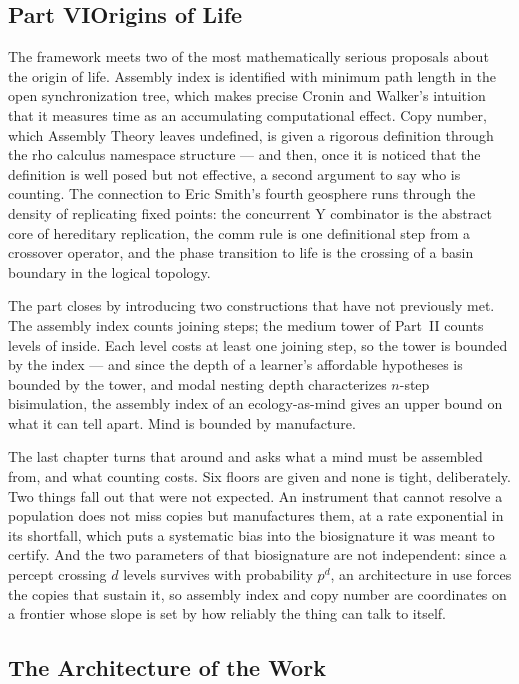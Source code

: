 \documentclass[12pt,openright,twoside]{book}
\theoremstyle{remark}
\theoremstyle{plain}
\theoremstyle{remark}
\theoremstyle{plain}
\theoremstyle{plain}
\begin{document}
\subsection*{Part VI\quad Origins of Life}

The framework meets two of the most mathematically serious proposals
about the origin of life.
Assembly index is identified with minimum path length in the open
synchronization tree, which makes precise Cronin and Walker's intuition
that it measures time as an accumulating computational effect.
Copy number, which Assembly Theory leaves undefined, is given a rigorous
definition through the rho calculus namespace structure --- and then, once
it is noticed that the definition is well posed but not effective, a
second argument to say who is counting.
The connection to Eric Smith's fourth geosphere runs through the density
of replicating fixed points: the concurrent Y combinator is the abstract
core of hereditary replication, the comm rule is one definitional step
from a crossover operator, and the phase transition to life is the
crossing of a basin boundary in the logical topology.

The part closes by introducing two constructions that have not previously
met.
The assembly index counts joining steps; the medium tower of Part~II
counts levels of inside.
Each level costs at least one joining step, so the tower is bounded by
the index --- and since the depth of a learner's affordable hypotheses is
bounded by the tower, and modal nesting depth characterizes $n$-step
bisimulation, the assembly index of an ecology-as-mind gives an upper
bound on what it can tell apart.
Mind is bounded by manufacture.

The last chapter turns that around and asks what a mind must be
assembled from, and what counting costs.
Six floors are given and none is tight, deliberately.
Two things fall out that were not expected.
An instrument that cannot resolve a population does not miss copies but
manufactures them, at a rate exponential in its shortfall, which puts a
systematic bias into the biosignature it was meant to certify.
And the two parameters of that biosignature are not independent: since a
percept crossing $d$ levels survives with probability $p^{d}$, an
architecture in use forces the copies that sustain it, so assembly index
and copy number are coordinates on a frontier whose slope is set by how
reliably the thing can talk to itself.

\bigskip

\subsection*{The Architecture of the Work}
\end{document}
